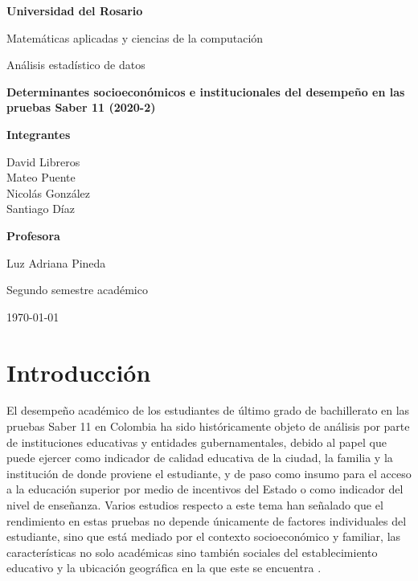 \documentclass[12pt]{article}
\newcommand{\portadaUniversidad}{Universidad del Rosario}
\newcommand{\portadaPrograma}{Matemáticas aplicadas y ciencias de la computación}
\newcommand{\portadaAsignatura}{Análisis estadístico de datos}
\newcommand{\portadaTitulo}{Determinantes socioeconómicos e institucionales del desempeño en las pruebas Saber 11 (2020-2)}
\newcommand{\portadaIntegrantes}{%
  David Libreros\\
  Mateo Puente \\
  Nicolás González\\
  Santiago Díaz}
\newcommand{\portadaProfesora}{Luz Adriana Pineda}
\newcommand{\portadaFecha}{\today}
\newcommand{\portadaSemestre}{Segundo semestre académico}
\begin{document}
\begin{titlepage}
  \thispagestyle{empty}
  \centering

  {\bfseries \portadaUniversidad\par}
  \vspace{0.6cm}
  {\portadaPrograma\par}
  \vspace{0.4cm}
  {\portadaAsignatura\par}

  \vfill

  {\bfseries \portadaTitulo\par}

  \vfill

  {
    \textbf{Integrantes}\par
    \vspace{0.3cm}
    \portadaIntegrantes\par
    \vspace{0.8cm}
    \textbf{Profesora}\par
    \vspace{0.3cm}
    \portadaProfesora\par
  }

  \vfill

  {
    \portadaSemestre\par
    \portadaFecha\par
  }
\end{titlepage}

\setcounter{page}{1}

\section{Introducción}
El desempeño académico de los estudiantes de último grado de bachillerato en las pruebas Saber 11 en Colombia ha sido históricamente objeto de análisis por parte de instituciones educativas y entidades gubernamentales, debido al papel que puede ejercer como indicador de calidad educativa de la ciudad, la familia y la institución de donde proviene el estudiante, y de paso como insumo para el acceso a la educación superior por medio de incentivos del Estado o como indicador del nivel de enseñanza. Varios estudios respecto a este tema han señalado que el rendimiento en estas pruebas no depende únicamente de factores individuales del estudiante, sino que está mediado por el contexto socioeconómico y familiar, las características no solo académicas sino también sociales del establecimiento educativo y la ubicación geográfica en la que este se encuentra \parencite{garciagil2021}.
\end{document}
